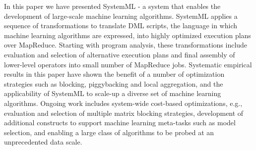 In this paper we have presented SystemML - a system that enables the development of large-scale machine learning algorithms.  SystemML applies a sequence of transformations to translate DML scripts, the language in which machine learning algorithms are expressed, into highly optimized execution plans over MapReduce.  Starting with program analysis, these transformations include evaluation and selection of alternative execution plans and final assembly of lower-level operators into small number of MapReduce jobs.  Systematic empirical results in this paper have shown the benefit of a number of optimization strategies such as blocking, piggybacking and local aggregation, and the applicability of SystemML to scale-up a diverse set of machine learning algorithms. Ongoing work includes system-wide cost-based optimizations, e.g., evaluation and selection of multiple matrix blocking strategies, development of additional constructs to support machine learning meta-tasks such as model selection, and enabling a large class of algorithms to be probed at an unprecedented data scale. 